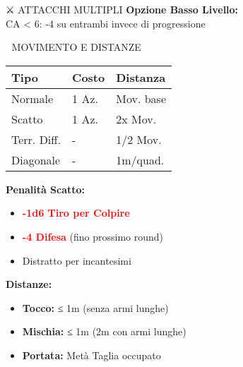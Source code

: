 \documentclass[10pt,a4paper,landscape]{article}
\newcommand{\critical}[1]{\textcolor{red}{\textbf{#1}}}
\begin{document}
\begin{multicols}{4}
\begin{mainsection}{⚔️ ATTACCHI MULTIPLI}
			\textbf{Opzione Basso Livello:}\\
			CA < 6: -4 su entrambi invece di progressione
		\end{mainsection}

		\begin{mainsection}{🏃 MOVIMENTO E DISTANZE}
			\begin{tabular}{@{}p{2cm}p{1cm}p{2.5cm}@{}}
				\toprule
				\textbf{Tipo} & \textbf{Costo} & \textbf{Distanza} \\
				\midrule
				Normale & 1 Az. & Mov. base \\
				Scatto & 1 Az. & 2x Mov. \\
				Terr. Diff. & - & 1/2 Mov. \\
				Diagonale & - & 1m/quad. \\
				\bottomrule
			\end{tabular}

			\textbf{Penalità Scatto:}
			\begin{itemize}[noitemsep,leftmargin=8pt]
				\item \critical{-1d6 Tiro per Colpire}
				\item \critical{-4 Difesa} (fino prossimo round)
				\item Distratto per incantesimi
			\end{itemize}

			\textbf{Distanze:}
			\begin{itemize}[noitemsep,leftmargin=8pt]
				\item \textbf{Tocco:} ≤ 1m (senza armi lunghe)
				\item \textbf{Mischia:} ≤ 1m (2m con armi lunghe)
				\item \textbf{Portata:} Metà Taglia occupato
			\end{itemize}
		\end{mainsection}

		\columnbreak


\end{multicols}
\end{document}

